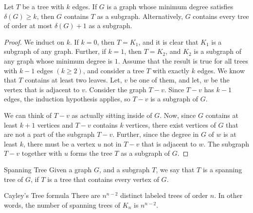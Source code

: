\documentclass[../basic_graph_theory.tex]{subfiles}
\begin{document}
\begin{Thm}{}{}
    Let $T$ be a tree with $k$ edges. If $G$ is a graph whose minimum degree satisfies $\delta(G) \ge k$, then $G$ contains $T$ as a subgraph. Alternatively, $G$ contains every tree of order at most $\delta(G) + 1$ as a subgraph.
\end{Thm}
\begin{proof}
    We induct on $k$. If $k=0$, then $T=K_{1}$, and it is clear that $K_{1}$ is a subgraph of any graph. Further, if $k=1$, then $T=K_{2}$, and $K_{2}$ is a subgraph of any graph whose minimum degree is $1$. Assume that the result is true for all trees with $k-1$ edges $(k \ge 2)$, and consider a tree $T$ with exactly $k$ edges. We know that $T$ contains at least two leaves. Let, $v$ be one of them, and let, $w$ be the vertex that is adjacent to $v$. Consider the graph $T-v$. Since $T-v$ has $k-1$ edges, the induction hypothesis applies, so $T-v$ is a subgraph of $G$.

    We can think of $T-v$ as actually sitting inside of $G$. Now, since $G$ contains at least $k+1$ vertices and $T-v$ contains $k$ vertices, there exist vertices of $G$ that are not a part of the subgraph $T-v$. Further, since the degree in $G$ of $w$ is at least $k$, there must be a vertex $u$ not in $T-v$ that is adjacent to $w$. The subgraph $T-v$ together with $u$ forms the tree $T$ as a subgraph of $G$.
\end{proof}

\begin{Def}{Spanning Tree}{}
    Given a graph $G$, and a subgraph $T$, we say that $T$ is a spanning tree of $G$, if $T$ is a tree that contains every vertex of $G$.
\end{Def}

\begin{Thm}{Cayley's Tree formula}{}
    There are $n^{n-2}$ distinct labeled trees of order $n$. In other words, the number of spanning trees of $K_{n}$ is $n^{n-2}$.
\end{Thm}

\end{document}
